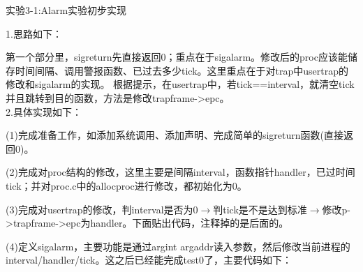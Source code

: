 \documentclass[12pt]{article}
\begin{document}
\begin{Large}
	\noindent 实验3-1:Alarm实验初步实现\\
\end{Large}
1.思路如下：\par
第一个部分里，sigreturn先直接返回0；重点在于sigalarm。修改后的proc应该能储存时间间隔、调用警报函数、已过去多少tick。这里重点在于对trap中usertrap的修改和sigalarm的实现。
根据提示，在usertrap中，若tick==interval，就清空tick并且跳转到目的函数，方法是修改trapframe->epc。\\
2.具体实现如下：\par
(1)完成准备工作，如添加系统调用、添加声明、完成简单的sigreturn函数(直接返回0)。\par
(2)完成对proc结构的修改，这里主要是间隔interval，函数指针handler，已过时间tick；并对proc.c中的allocproc进行修改，都初始化为0。\par
(3)完成对usertrap的修改，判interval是否为0$\rightarrow$判tick是不是达到标准$\rightarrow$修改p->trapframe->epc为handler。下面贴出代码，注释掉的是后面的。\par
(4)定义sigalarm，主要功能是通过argint argaddr读入参数，然后修改当前进程的interval/handler/tick。这之后已经能完成test0了，主要代码如下：
\begin{figure}[!h]
    \centering
    \hfill
\end{figure}
\end{document}
